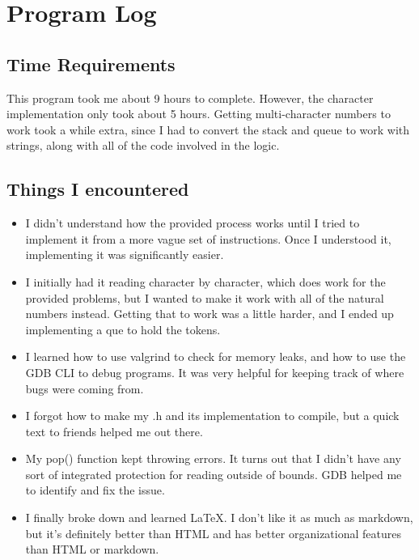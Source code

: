 \documentclass{article}
\begin{document}
        

    \newpage

    
\section{Program Log}
    \subsection{Time Requirements}
    This program took me about 9 hours to complete. However, the character implementation only took about 5 hours. Getting multi-character numbers to work took a while extra, since I had to convert the stack and queue to work with strings, along with all of the code involved in the logic.

    \subsection{Things I encountered}
    \begin{itemize}
        \item I didn't understand how the provided process works until I tried to implement it from a more vague set of instructions. Once I understood it, implementing it was significantly easier.
        \item I initially had it reading character by character, which does work for the provided problems, but I wanted to make it work with all of the natural numbers instead. Getting that to work was a little harder, and I ended up implementing a que to hold the tokens.
        \item I learned how to use valgrind to check for memory leaks, and how to use the GDB CLI to debug programs. It was very helpful for keeping track of where bugs were coming from.
        \item I forgot how to make my .h and its implementation to compile, but a quick text to friends helped me out there.
        \item My pop() function kept throwing errors. It turns out that I didn't have any sort of integrated protection for reading outside of bounds. GDB helped me to identify and fix the issue.
        \item I finally broke down and learned LaTeX. I don't like it as much as markdown, but it's definitely better than HTML and has better organizational features than HTML or markdown.
    \end{itemize}
    
\newpage
\end{document}
